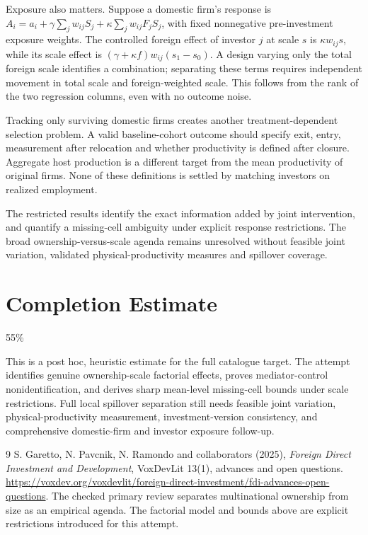 \documentclass[11pt,a4paper]{article}
\begin{document}
Exposure also matters. Suppose a domestic firm's response is $A_i=a_i+\gamma\sum_jw_{ij}S_j+\kappa\sum_jw_{ij}F_jS_j$, with fixed nonnegative pre-investment exposure weights. The controlled foreign effect of investor $j$ at scale $s$ is $\kappa w_{ij}s$, while its scale effect is $(\gamma+\kappa f)w_{ij}(s_1-s_0)$. A design varying only the total foreign scale identifies a combination; separating these terms requires independent movement in total scale and foreign-weighted scale. This follows from the rank of the two regression columns, even with no outcome noise.

Tracking only surviving domestic firms creates another treatment-dependent selection problem. A valid baseline-cohort outcome should specify exit, entry, measurement after relocation and whether productivity is defined after closure. Aggregate host production is a different target from the mean productivity of original firms. None of these definitions is settled by matching investors on realized employment.

The restricted results identify the exact information added by joint intervention, and quantify a missing-cell ambiguity under explicit response restrictions. The broad ownership-versus-scale agenda remains unresolved without feasible joint variation, validated physical-productivity measures and spillover coverage.

\section{Completion Estimate}
55\%

This is a post hoc, heuristic estimate for the full catalogue target.
The attempt identifies genuine ownership-scale factorial effects, proves mediator-control nonidentification, and derives sharp mean-level missing-cell bounds under scale restrictions. Full local spillover separation still needs feasible joint variation, physical-productivity measurement, investment-version consistency, and comprehensive domestic-firm and investor exposure follow-up.

\begin{thebibliography}{9}
 S. Garetto, N. Pavcnik, N. Ramondo and collaborators (2025), \emph{Foreign Direct Investment and Development}, VoxDevLit 13(1), advances and open questions. \url{https://voxdev.org/voxdevlit/foreign-direct-investment/fdi-advances-open-questions}. The checked primary review separates multinational ownership from size as an empirical agenda. The factorial model and bounds above are explicit restrictions introduced for this attempt.
\end{thebibliography}
\end{document}

